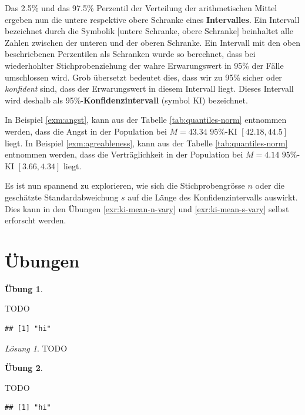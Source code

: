 \documentclass[
]{book}
\theoremstyle{definition}
\theoremstyle{definition}
\theoremstyle{definition}
\newtheorem{exercise}{Übung}[chapter]
\theoremstyle{definition}
\theoremstyle{remark}
\newtheorem*{solution}{Lösung}
\begin{document}
Das 2.5\% und das 97.5\% Perzentil der Verteilung der arithmetischen Mittel ergeben nun die untere respektive obere Schranke eines \label{customdef-interval}{\textbf{Intervalles}. Ein Intervall bezeichnet durch die Symbolik \([\)untere Schranke, obere Schranke\(]\) beinhaltet alle Zahlen zwischen der unteren und der oberen Schranke.} \label{customdef-confidence-interval}{Ein Intervall mit den oben beschriebenen Perzentilen als Schranken wurde so berechnet, dass bei wiederhohlter Stichprobenziehung der wahre Erwarungswert in 95\% der Fälle umschlossen wird. Grob übersetzt bedeutet dies, dass wir zu 95\% sicher oder \emph{konfident} sind, dass der Erwarungswert in diesem Intervall liegt. Dieses Intervall wird deshalb als 95\%-\textbf{Konfidenzintervall} (symbol KI) bezeichnet.}

In Beispiel \ref{exm:angst}, kann aus der Tabelle \ref{tab:quantiles-norm} entnommen werden, dass die Angst in der Population bei \(M = 43.34\) \(95\%\)-KI \([42.18,44.5]\) liegt. In Beispiel \ref{exm:agreableness}, kann aus der Tabelle \ref{tab:quantiles-norm} entnommen werden, dass die Verträglichkeit in der Population bei \(M = 4.14\) \(95\%\)-KI \([3.66,4.34]\) liegt.

Es ist nun spannend zu explorieren, wie sich die Stichprobengrösse \(n\) oder die geschätzte Standardabweichung \(s\) auf die Länge des Konfidenzintervalls auswirkt. Dies kann in den Übungen \ref{exr:ki-mean-n-vary} und \ref{exr:ki-mean-s-vary} selbst erforscht werden.

\section{Übungen}\label{uxfcbungen-1}

\begin{exercise}
\protect\hypertarget{exr:interpret-report1}{}\label{exr:interpret-report1}

TODO

\begin{verbatim}
## [1] "hi"
\end{verbatim}

\end{exercise}

\begin{solution}
TODO
\end{solution}

\begin{exercise}
\protect\hypertarget{exr:interpret-report2}{}\label{exr:interpret-report2}

TODO

\begin{verbatim}
## [1] "hi"
\end{verbatim}

\end{exercise}
\end{document}
